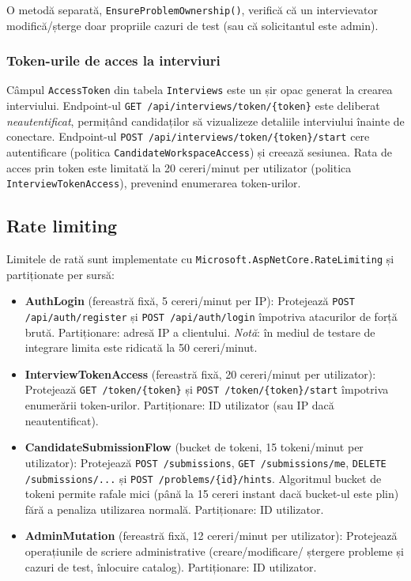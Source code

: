 O metodă separată, \texttt{EnsureProblemOwnership()}, verifică că un
intervievator modifică/șterge doar propriile cazuri de test (sau că
solicitantul este admin).

\subsubsection{Token-urile de acces la interviuri}

Câmpul \texttt{AccessToken} din tabela \texttt{Interviews} este un șir
opac generat la crearea interviului. Endpoint-ul
\texttt{GET /api/interviews/token/\{token\}} este deliberat \emph{neautentificat},
permițând candidaților să vizualizeze detaliile interviului înainte de
conectare. Endpoint-ul
\texttt{POST /api/interviews/token/\{token\}/start} cere autentificare
(politica \texttt{CandidateWorkspaceAccess}) și creează sesiunea.
Rata de acces prin token este limitată la 20 cereri/minut per utilizator
(politica \texttt{InterviewTokenAccess}), prevenind enumerarea token-urilor.

\subsection{Rate limiting}

Limitele de rată sunt implementate cu
\texttt{Microsoft.AspNetCore.RateLimiting} și partiționate per sursă:

\begin{itemize}
  \item \textbf{AuthLogin} (fereastră fixă, 5 cereri/minut per IP):
        Protejează \texttt{POST /api/auth/register} și
        \texttt{POST /api/auth/login} împotriva atacurilor de forță brută.
        Partiționare: adresă IP a clientului.
        \emph{Notă}: în mediul de testare de integrare limita este ridicată
        la 50 cereri/minut.

  \item \textbf{InterviewTokenAccess} (fereastră fixă, 20 cereri/minut per
        utilizator):
        Protejează \texttt{GET /token/\{token\}} și
        \texttt{POST /token/\{token\}/start} împotriva enumerării token-urilor.
        Partiționare: ID utilizator (sau IP dacă neautentificat).

  \item \textbf{CandidateSubmissionFlow} (bucket de tokeni, 15
        tokeni/minut per utilizator):
        Protejează \texttt{POST /submissions}, \texttt{GET /submissions/me},
        \texttt{DELETE /submissions/...} și \texttt{POST /problems/\{id\}/hints}.
        Algoritmul bucket de tokeni permite rafale mici (până la 15 cereri
        instant dacă bucket-ul este plin) fără a penaliza utilizarea normală.
        Partiționare: ID utilizator.

  \item \textbf{AdminMutation} (fereastră fixă, 12 cereri/minut per
        utilizator):
        Protejează operațiunile de scriere administrative (creare/modificare/
        ștergere probleme și cazuri de test, înlocuire catalog).
        Partiționare: ID utilizator.
\end{itemize}

